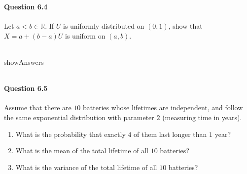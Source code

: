 \documentclass{article}
\begin{document}
%
%
{\bf Question 6.4}
~\\~\\
Let \(a<b\in\mathbb{R}\). If \(U\) is uniformly distributed on $(0, 1)$, show that $X=a + (b-a)U$ is uniform
on $(a, b)$.
~\\~\\
\begin{maybePrint}{showAnswers}
~\\~\\
\end{maybePrint}
%
%
{\bf Question 6.5}
~\\~\\
Assume that there are $10$ batteries whose lifetimes are independent, and follow the same exponential distribution with parameter $2$ (measuring time in years).  
\begin{enumerate}
\item[(a)] What is the probability that exactly $4$ of them last longer than $1$ year?
\item[(b)] What is the mean of the total lifetime of all \(10\) batteries?
\item[(c)] What is the variance of the total lifetime of all \(10\) batteries?
\end{enumerate}
\end{document}
